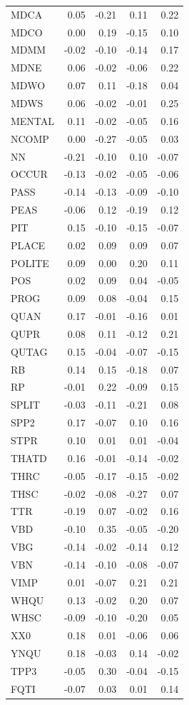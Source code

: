 \documentclass[
  letterpaper,
  DIV=11,
  numbers=noendperiod]{scrreprt}
\begin{document}
\begin{longtable}[]{@{}lrrrr@{}}
MDCA & 0.05 & -0.21 & 0.11 & 0.22 \\
MDCO & 0.00 & 0.19 & -0.15 & 0.10 \\
MDMM & -0.02 & -0.10 & -0.14 & 0.17 \\
MDNE & 0.06 & -0.02 & -0.06 & 0.22 \\
MDWO & 0.07 & 0.11 & -0.18 & 0.04 \\
MDWS & 0.06 & -0.02 & -0.01 & 0.25 \\
MENTAL & 0.11 & -0.02 & -0.05 & 0.16 \\
NCOMP & 0.00 & -0.27 & -0.05 & 0.03 \\
NN & -0.21 & -0.10 & 0.10 & -0.07 \\
OCCUR & -0.13 & -0.02 & -0.05 & -0.06 \\
PASS & -0.14 & -0.13 & -0.09 & -0.10 \\
PEAS & -0.06 & 0.12 & -0.19 & 0.12 \\
PIT & 0.15 & -0.10 & -0.15 & -0.07 \\
PLACE & 0.02 & 0.09 & 0.09 & 0.07 \\
POLITE & 0.09 & 0.00 & 0.20 & 0.11 \\
POS & 0.02 & 0.09 & 0.04 & -0.05 \\
PROG & 0.09 & 0.08 & -0.04 & 0.15 \\
QUAN & 0.17 & -0.01 & -0.16 & 0.01 \\
QUPR & 0.08 & 0.11 & -0.12 & 0.21 \\
QUTAG & 0.15 & -0.04 & -0.07 & -0.15 \\
RB & 0.14 & 0.15 & -0.18 & 0.07 \\
RP & -0.01 & 0.22 & -0.09 & 0.15 \\
SPLIT & -0.03 & -0.11 & -0.21 & 0.08 \\
SPP2 & 0.17 & -0.07 & 0.10 & 0.16 \\
STPR & 0.10 & 0.01 & 0.01 & -0.04 \\
THATD & 0.16 & -0.01 & -0.14 & -0.02 \\
THRC & -0.05 & -0.17 & -0.15 & -0.02 \\
THSC & -0.02 & -0.08 & -0.27 & 0.07 \\
TTR & -0.19 & 0.07 & -0.02 & 0.16 \\
VBD & -0.10 & 0.35 & -0.05 & -0.20 \\
VBG & -0.14 & -0.02 & -0.14 & 0.12 \\
VBN & -0.14 & -0.10 & -0.08 & -0.07 \\
VIMP & 0.01 & -0.07 & 0.21 & 0.21 \\
WHQU & 0.13 & -0.02 & 0.20 & 0.07 \\
WHSC & -0.09 & -0.10 & -0.20 & 0.05 \\
XX0 & 0.18 & 0.01 & -0.06 & 0.06 \\
YNQU & 0.18 & -0.03 & 0.14 & -0.02 \\
TPP3 & -0.05 & 0.30 & -0.04 & -0.15 \\
FQTI & -0.07 & 0.03 & 0.01 & 0.14 \\
\end{longtable}
\end{document}
